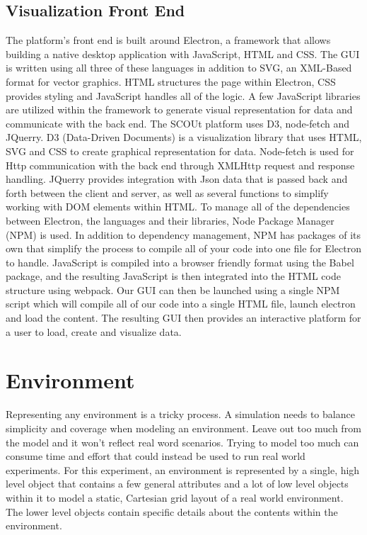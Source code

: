 \subsection{Visualization Front End}
The platform's front end is built around Electron,  a framework that allows building a native desktop application with JavaScript, HTML and CSS.
The GUI is written using all three of these languages in addition to SVG, an XML-Based format for vector graphics.
HTML structures the page within Electron, CSS provides styling and JavaScript handles all of the logic.
A few JavaScript libraries are utilized within the framework to generate visual representation for data and communicate with the back end.
The SCOUt platform uses D3, node-fetch and JQuerry. 
D3 (Data-Driven Documents) is a visualization library that uses HTML, SVG and CSS to create graphical representation for data.
Node-fetch is used for Http communication with the back end through XMLHttp request and response handling.
JQuerry provides integration with Json data that is passed back and forth between the client and server, as well as several functions to simplify working with DOM elements within HTML.
To manage all of the dependencies between Electron, the languages and their libraries, Node Package Manager (NPM)  is used.
In addition to dependency management, NPM has packages of its own that simplify the process to compile all of your code into one file for Electron to handle.
JavaScript is compiled into a browser friendly format using the Babel package, and the resulting JavaScript is then integrated into the HTML code structure using webpack.
Our GUI can then be launched using a single NPM script which will compile all of our code into a single HTML file, launch electron and load the content.
The resulting GUI then provides an interactive platform for a user to load, create and visualize data.



\section{Environment}
Representing any environment is a tricky process.
A simulation needs to balance simplicity and coverage when modeling an environment.
Leave out too much from the model and it won’t reflect real word scenarios.
Trying to model too much can consume time and effort that could instead be used to run real world experiments.
For this experiment, an environment is represented by a single, high level object that contains a few general attributes and a lot of low level objects within it to model a static, Cartesian grid layout of a real world environment.
The lower level objects contain specific details about the contents within the environment.

